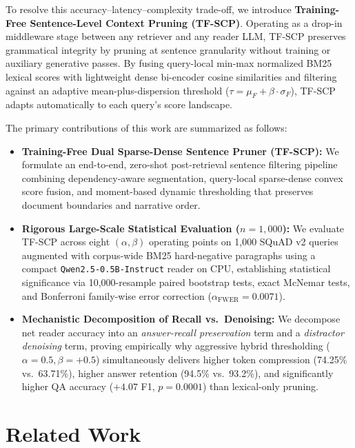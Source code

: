 \documentclass[conference]{IEEEtran}
\begin{document}
To resolve this accuracy--latency--complexity trade-off, we introduce \textbf{Training-Free Sentence-Level Context Pruning (TF-SCP)}. Operating as a drop-in middleware stage between any retriever and any reader LLM, TF-SCP preserves grammatical integrity by pruning at sentence granularity without training or auxiliary generative passes. By fusing query-local min-max normalized BM25 lexical scores with lightweight dense bi-encoder cosine similarities and filtering against an adaptive mean-plus-dispersion threshold ($\tau = \mu_F + \beta \cdot \sigma_F$), TF-SCP adapts automatically to each query's score landscape.

The primary contributions of this work are summarized as follows:
\begin{itemize}
    \item \textbf{Training-Free Dual Sparse-Dense Sentence Pruner (TF-SCP):} We formulate an end-to-end, zero-shot post-retrieval sentence filtering pipeline combining dependency-aware segmentation, query-local sparse-dense convex score fusion, and moment-based dynamic thresholding that preserves document boundaries and narrative order.
    \item \textbf{Rigorous Large-Scale Statistical Evaluation ($n=1,000$):} We evaluate TF-SCP across eight $(\alpha, \beta)$ operating points on 1,000 SQuAD v2 queries augmented with corpus-wide BM25 hard-negative paragraphs using a compact \texttt{Qwen2.5-0.5B-Instruct} reader on CPU, establishing statistical significance via 10,000-resample paired bootstrap tests, exact McNemar tests, and Bonferroni family-wise error correction ($\alpha_{\mathrm{FWER}} = 0.0071$).
    \item \textbf{Mechanistic Decomposition of Recall vs.\ Denoising:} We decompose net reader accuracy into an \emph{answer-recall preservation} term and a \emph{distractor denoising} term, proving empirically why aggressive hybrid thresholding ($\alpha=0.5, \beta=+0.5$) simultaneously delivers higher token compression (74.25\% vs.\ 63.71\%), higher answer retention (94.5\% vs.\ 93.2\%), and significantly higher QA accuracy ($+4.07$ F1, $p=0.0001$) than lexical-only pruning.
\end{itemize}

\section{Related Work}
\end{document}
